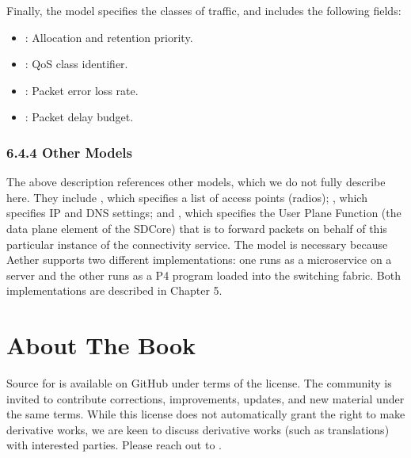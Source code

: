 \documentclass[a4paper,11pt,english]{sphinxmanual}
\begin{document}
\sphinxAtStartPar
Finally, the  model specifies the classes of traffic,
and includes the following fields:
\begin{itemize}
\item {} 
\sphinxAtStartPar
{}: Allocation and retention priority.

\item {} 
\sphinxAtStartPar
{}: QoS class identifier.

\item {} 
\sphinxAtStartPar
{}: Packet error loss rate.

\item {} 
\sphinxAtStartPar
{}: Packet delay budget.

\end{itemize}


\subsection{6.4.4 Other Models}
\label{\detokenize{cloud:other-models}}
\sphinxAtStartPar
The above description references other models, which we do not fully
describe here. They include , which specifies a list of
access points (radios); , which specifies IP and DNS
settings; and , which specifies the User Plane Function (the data
plane element of the SD\sphinxhyphen{}Core) that is to forward packets on behalf of
this particular instance of the connectivity service. The  model
is necessary because Aether supports two different implementations:
one runs as a microservice on a server and the other runs as a P4
program loaded into the switching fabric. Both implementations are
described in Chapter 5.


\chapter{About The Book}
\label{\detokenize{README:about-the-book}}\label{\detokenize{README::doc}}
\sphinxAtStartPar
Source for  is available
on GitHub under
terms of the  license. The
community is invited to contribute corrections, improvements, updates,
and new material under the same terms. While this license does not
automatically grant the right to make derivative works, we are keen to
discuss derivative works (such as translations) with interested
parties. Please reach out to .
\end{document}
